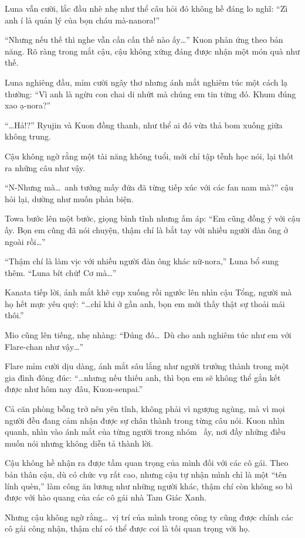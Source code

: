 \documentclass[../main.tex]{subfiles}
\begin{document}
Luna vẫn cười, lắc đầu nhè nhẹ như thể câu hỏi đó không hề đáng lo nghĩ: ``Zì anh í là quản lý của bọn cháu mà-nanora!''

``Nhưng nếu thế thì nghe vẫn cấn cấn thế nào ấy\dots'' Kuon phản ứng theo bản năng. Rõ ràng trong mắt cậu, cậu không xứng đáng được nhận một món quà như thế.

Luna nghiêng đầu, mỉm cười ngây thơ nhưng ánh mắt nghiêm túc một cách lạ thường: ``Vì anh là ngừu con chai di nhứt mà chúng em tin từng đó. Khum đúng xao ạ-nora?''

``\dots Hả!?'' Ryujin và Kuon đồng thanh, như thể ai đó vừa thả bom xuống giữa không trung.

Cậu không ngờ rằng một tài năng không tuổi, mới chỉ tập tễnh học nói, lại thốt ra những câu như vậy.

``N-Nhưng mà\dots\ anh tưởng mấy đứa đã từng tiếp xúc với các fan nam mà?'' cậu hỏi lại, dường như muốn phản biện.

Towa bước lên một bước, giọng bình tĩnh nhưng ấm áp: ``Em cũng đồng ý với cậu ấy. Bọn em cũng đã nói chuyện, thậm chí là bắt tay với nhiều người đàn ông ở ngoài rồi\dots''

``Thậm chí là làm vịc với nhiều người đàn ông khác nữ-nora,'' Luna bổ sung thêm. ``Luna bít chứ! Cơ mà\dots''

Kanata tiếp lời, ánh mắt khẽ cụp xuống rồi ngước lên nhìn cậu Tổng, người mà họ hết mực yêu quý: ``\dots chỉ khi ở gần anh, bọn em mới thấy thật sự thoải mái thôi.''

Mio cũng lên tiếng, nhẹ nhàng: ``Đúng đó\dots\ Dù cho anh nghiêm túc như em với Flare-chan như vậy\dots''

Flare mỉm cười dịu dàng, ánh mắt sâu lắng như người trưởng thành trong một gia đình đông đúc: ``\dots nhưng nếu thiếu anh, thì bọn em sẽ không thể gắn kết được như hôm nay đâu, Kuon-senpai.''

Cả căn phòng bỗng trở nên yên tĩnh, không phải vì ngượng ngùng, mà vì mọi người đều đang cảm nhận được sự chân thành trong từng câu nói. Kuon nhìn quanh, nhìn vào ánh mắt của từng người trong nhóm \hll\ ấy, nơi đầy những điều muốn nói nhưng không diễn tả thành lời.

Cậu không hề nhận ra được tầm quan trọng của mình đối với các cô gái. Theo bản thân cậu, dù có chức vụ rất cao, nhưng cậu tự nhận mình chỉ là một ``tên lính quèn,'' làm công ăn lương như những người khác, thậm chí còn không so bì được với hào quang của các cô gái nhà Tam Giác Xanh.

Nhưng cậu không ngờ rằng\dots\ vị trí của mình trong công ty cũng được chính các cô gái công nhận, thậm chí có thể được coi là tối quan trọng với họ.
\end{document}
